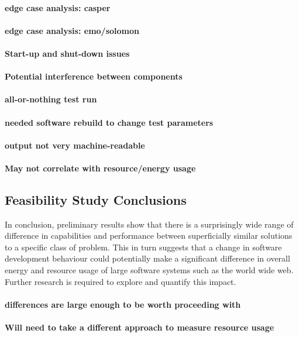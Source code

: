 \paragraph{edge case analysis: casper}
\paragraph{edge case analysis: emo/solomon}
\paragraph{Start-up and shut-down issues}
\paragraph{Potential interference between components}
\paragraph{all-or-nothing test run}
\paragraph{needed software rebuild to change test parameters}
\paragraph{output not very machine-readable}
\paragraph{May not correlate with resource/energy usage}
\paragraph{}

\subsection{Feasibility Study Conclusions}

In conclusion, preliminary results show that there is a surprisingly wide range of difference in capabilities and performance between superficially similar solutions to a specific class of problem. This in turn suggests that a change in software development behaviour could potentially make a significant difference in overall energy and resource usage of large software systems such as the world wide web. Further research is required to explore and quantify this impact.

\paragraph{differences are large enough to be worth proceeding with}
\paragraph{Will need to take a different approach to measure resource usage}
